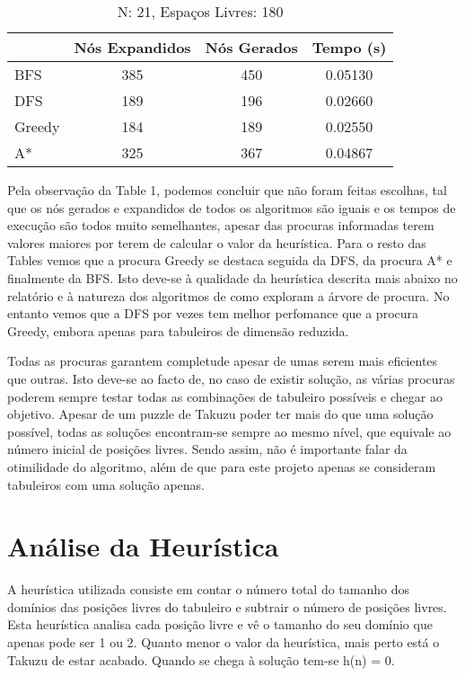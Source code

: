 \documentclass[12pt,a4paper]{article}
\begin{document}
  \begin{table}[H]
    \caption{N: 21, Espaços Livres: 180}
    \label{tab:my-table3}
    \centering
    \begin{tabular}{lccc}
      & Nós Expandidos & Nós Gerados & Tempo (s) \\
      \hline
      BFS    & 385 & 450 & 0.05130 \\
      DFS    & 189 & 196 & 0.02660 \\
      Greedy & 184 & 189 & 0.02550 \\
      A*     & 325 & 367 & 0.04867 \\
    \hline
    \end{tabular}
  \end{table}

  Pela observação da Table 1, podemos concluir que não foram feitas escolhas, tal que os nós gerados e expandidos de todos os algoritmos são iguais e os tempos de execução são todos muito semelhantes, apesar das procuras informadas terem valores maiores por terem de calcular o valor da heurística.
  Para o resto das Tables vemos que a procura Greedy se destaca seguida da DFS, da procura A* e finalmente da BFS.
  Isto deve-se à qualidade da heurística descrita mais abaixo no relatório e à natureza dos algoritmos de como exploram a árvore de procura.
  No entanto vemos que a DFS por vezes tem melhor perfomance que a procura Greedy, embora apenas para tabuleiros de dimensão reduzida. 
  
  Todas as procuras garantem completude apesar de umas serem mais eficientes que outras. Isto deve-se ao facto de, no caso de existir solução, as várias procuras poderem sempre testar todas as combinações de tabuleiro possíveis e chegar ao objetivo.
  Apesar de um puzzle de Takuzu poder ter mais do que uma solução possível, todas as soluções encontram-se sempre ao mesmo nível, que equivale ao número inicial de posições livres. Sendo assim, não é importante falar da otimilidade do algoritmo, 
  além de que para este projeto apenas se consideram tabuleiros com uma solução apenas.
  
  \section{Análise da Heurística}

  A heurística utilizada consiste em contar o número total do tamanho dos domínios das posições livres do tabuleiro e subtrair o número de posições livres.
  Esta heurística analisa cada posição livre e vê o tamanho do seu domínio que apenas pode ser 1 ou 2.
  Quanto menor o valor da heurística, mais perto está o Takuzu de estar acabado.
  Quando se chega à solução tem-se h(n) = 0.
  
\end{document}
